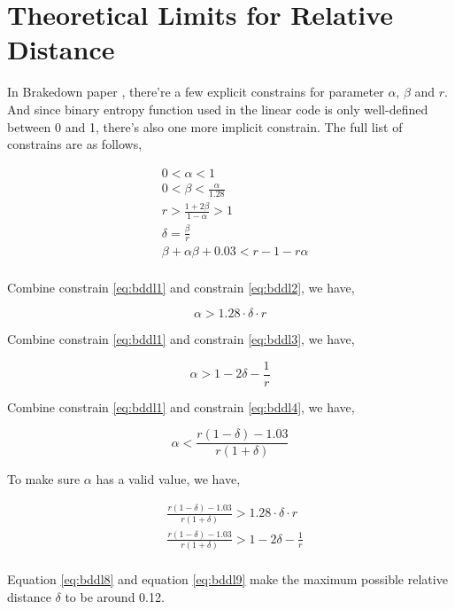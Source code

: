 \section{Theoretical Limits for Relative Distance}

In Brakedown paper \cite{brakedown}, there're a few explicit constrains for parameter $\alpha$, $\beta$ and $r$. And since binary entropy function used in the linear code is only well-defined between 0 and 1, there's also one more implicit constrain. The full list of constrains are as follows,

\begin{align}
& 0 < \alpha < 1 \nonumber \\
& 0 < \beta < \frac{\alpha}{1.28} \label{eq:bddl2} \\
& r > \frac{1 + 2\beta}{1 - \alpha} > 1 \label{eq:bddl3} \\
& \delta = \frac{\beta}{r} \label{eq:bddl1} \\
& \beta + \alpha\beta + 0.03 < r - 1 - r\alpha \label{eq:bddl4} \\
\end{align}

Combine constrain \ref{eq:bddl1} and constrain \ref{eq:bddl2}, we have,

\begin{equation}
\label{eq:bddl5}
    \alpha > 1.28 \cdot \delta \cdot r 
\end{equation}
    

Combine constrain \ref{eq:bddl1} and constrain \ref{eq:bddl3}, we have,

\begin{equation}
\label{eq:bddl6}
    \alpha > 1 - 2\delta - \frac{1}{r} 
\end{equation}


Combine constrain \ref{eq:bddl1} and constrain \ref{eq:bddl4}, we have,

\begin{equation}
\label{eq:bddl7}
    \alpha < \frac{r(1 - \delta) - 1.03}{r(1 + \delta)}
\end{equation}

To make sure $\alpha$ has a valid value, we have,

\begin{align}
& \frac{r(1 - \delta) - 1.03}{r(1 + \delta)} > 1.28 \cdot \delta \cdot r \label{eq:bddl8} \\
& \frac{r(1 - \delta) - 1.03}{r(1 + \delta)} > 1 - 2\delta - \frac{1}{r}  \label{eq:bddl9} \\
\end{align}

Equation \ref{eq:bddl8} and equation \ref{eq:bddl9} make the maximum possible relative distance $\delta$ to be around 0.12.